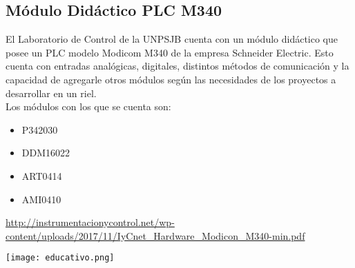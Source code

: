 

\subsection{Módulo Didáctico PLC M340} \label{sec:didac}

El Laboratorio de Control de la UNPSJB cuenta con un módulo didáctico que posee un PLC modelo Modicom M340 de la empresa Schneider Electric. Esto cuenta con entradas analógicas, digitales, distintos métodos de comunicación y la capacidad de agregarle otros módulos según las necesidades de los proyectos a desarrollar en un riel.  \\
Los módulos con los que se cuenta son:
\begin{itemize}
	\item P342030
	\item DDM16022
	\item ART0414
	\item AMI0410 
	
\end{itemize}
\url{http://instrumentacionycontrol.net/wp-content/uploads/2017/11/IyCnet_Hardware_Modicon_M340-min.pdf}
\begin{center}
	\texttt{[image: educativo.png]}
	\label{fig:didac}
\end{center}




